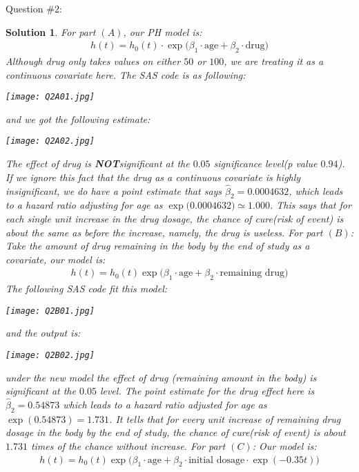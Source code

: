 \documentclass[11pt]{article}
\newtheorem{sol}{Solution}
\begin{document}
Question $\# 2$:
\begin{sol}
	For part $(A)$, our PH model is:
	\begin{align*}
		h(t) = h_0(t)\cdot \exp\Big(\beta_1 \cdot \text{age} + \beta_2\cdot \text{drug}\Big)
	\end{align*}
	Although drug only takes values on either $50$ or $100$, we are treating it as a continuous covariate here. The SAS code is as following:
	\begin{center}
		\texttt{[image: Q2A01.jpg]}
	\end{center}
	and we got the following estimate:
	\begin{center}
		\texttt{[image: Q2A02.jpg]}
	\end{center}
	The effect of drug is {\bf NOT}significant at the $0.05$ significance level(p value $0.94$). If we ignore this fact that the drug as a continuous covariate is highly insignificant, we do have a point estimate that says $\hat{\beta}_2 = 0.0004632$, which leads to a hazard ratio adjusting for age as $\exp\Big(0.0004632\Big) \simeq 1.000$. This says that for each single unit increase in the drug dosage, the chance of cure(risk of event) is about the same as before the increase, namely, the drug is useless.\vskip 2mm
	For part $(B)$:\vskip 2mm
	Take the amount of drug remaining in the body by the end of study as a covariate, our model is:
	\begin{align*}
		h(t) = h_0(t)\exp\Big(\beta_1 \cdot \text{age} + \beta_2 \cdot \text{remaining drug}\Big)
	\end{align*}
	The following SAS code fit this model:
	\begin{center}
		\texttt{[image: Q2B01.jpg]}
	\end{center}
	and the output is:
	\begin{center}
		\texttt{[image: Q2B02.jpg]}
	\end{center}
	under the new model the effect of drug (remaining amount in the body) is significant at the $0.05$ level. The point estimate for the drug effect here is $\hat{\beta}_2 = 0.54873$ which leads to a hazard ratio adjusted for age as $\exp(0.54873) = 1.731$. It tells that for every unit increase of remaining drug dosage in the body by the end of study,  the chance of cure(risk of event) is about $1.731$ times of the chance without increase.\vskip 2mm
	For part $(C)$:\vskip 2mm
	Our model is:
	\begin{align*}
		h(t) = h_0(t)\exp\Big(\beta_1 \cdot \text{age} + \beta_2 \cdot \text{initial dosage}\cdot \exp(-0.35t)\Big)

\end{align*}
\end{sol}
\end{document}
